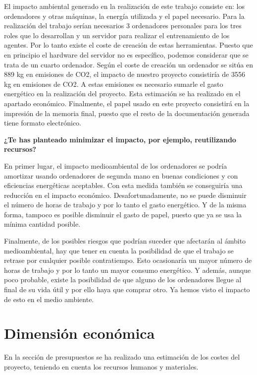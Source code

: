 El impacto ambiental generado en la realización de este trabajo consiste en: los ordenadores y otras máquinas, la energía utilizada y el papel necesario. Para la realización del trabajo serían necesarios 3 ordenadores personales para los tres roles que lo desarrollan y un servidor para realizar el entrenamiento de los agentes. Por lo tanto existe el coste de creación de estas herramientas. Puesto que en principio el hardware del servidor no es específico, podemos considerar que se trata de un cuarto ordenador. Según \cite{coste_ordenador} el coste de creación un ordenador se sitúa en 889 kg en emisiones de CO2, el impacto de nuestro proyecto consistiría de 3556 kg en emisiones de CO2. A estas emisiones es necesario sumarle el gasto energético en la realización del proyecto. Esta estimación se ha realizado en el apartado económico. Finalmente, el papel usado en este proyecto consistirá en la impresión de la memoria final, puesto que el resto de la documentación generada tiene formato electrónico.  

\textbf{¿Te has planteado minimizar el impacto, por ejemplo, reutilizando recursos?}

En primer lugar, el impacto medioambiental de los ordenadores se podría amortizar usando ordenadores de segunda mano en buenas condiciones y con eficiencias energéticas aceptables. Con esta medida también se conseguiría una reducción en el impacto económico. Desafortunadamente, no se puede disminuir el número de horas de trabajo y por lo tanto el gasto energético. Y de la misma forma, tampoco es posible disminuir el gasto de papel, puesto que ya se usa la mínima cantidad posible. 

Finalmente, de los posibles riesgos que podrían suceder que afectarán al ámbito medioambiental, hay que tener en cuenta la posibilidad de que el trabajo se retrase por cualquier posible contratiempo. Esto ocasionaría un mayor número de horas de trabajo y por lo tanto un mayor consumo energético. Y además, aunque poco probable, existe la posibilidad de que alguno de los ordenadores llegue al final de su vida útil y por ello haya que comprar otro. Ya hemos visto el impacto de esto en el medio ambiente.

\section{Dimensión económica}

En la sección de presupuestos se ha realizado una estimación de los costes del proyecto, teniendo en cuenta los recursos humanos y materiales.

